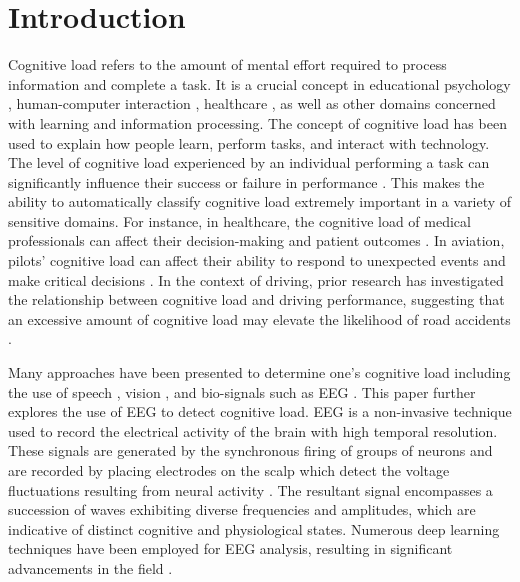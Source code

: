 \documentclass[sigconf]{acmart}
\begin{document}
\section{Introduction}
Cognitive load refers to the amount of mental effort required to process information and complete a task. It is a crucial concept in educational psychology \cite{sweller2016cognitive}, human-computer interaction \cite{hollender2010integrating}, healthcare \cite{fraser2015cognitive}, as well as other domains concerned with learning and information processing. The concept of cognitive load has been used to explain how people learn, perform tasks, and interact with technology. The level of cognitive load experienced by an individual performing a task can significantly influence their success or failure in performance \cite{das2014cognitive}. This makes the ability to automatically classify cognitive load extremely important in a variety of sensitive domains. For instance, in healthcare, the cognitive load of medical professionals can affect their decision-making and patient outcomes \cite{ehrmann2022evaluating}. In aviation, pilots' cognitive load can affect their ability to respond to unexpected events and make critical decisions \cite{huttunen2011effect}. In the context of driving, prior research has investigated the relationship between cognitive load and driving performance, suggesting that an excessive amount of cognitive load may elevate the likelihood of road accidents \cite{engstrom2017effects}. 

Many approaches have been presented to determine one's cognitive load including the use of speech \cite{hecker2022quantifying}, vision \cite{biondi2023distracted}, and bio-signals such as EEG \cite{antonenko2010using}. This paper further explores the use of EEG to detect cognitive load. EEG is a non-invasive technique used to record the electrical activity of the brain with high temporal resolution. These signals are generated by the synchronous firing of groups of neurons and are recorded by placing electrodes on the scalp which detect the voltage fluctuations resulting from neural activity \cite{gloor1969hans}. The resultant signal encompasses a succession of waves exhibiting diverse frequencies and amplitudes, which are indicative of distinct cognitive and physiological states. Numerous deep learning techniques have been employed for EEG analysis, resulting in significant advancements in the field \cite{zhang2020spatio, zhang2019classification, zhang2023partial}.
\end{document}
